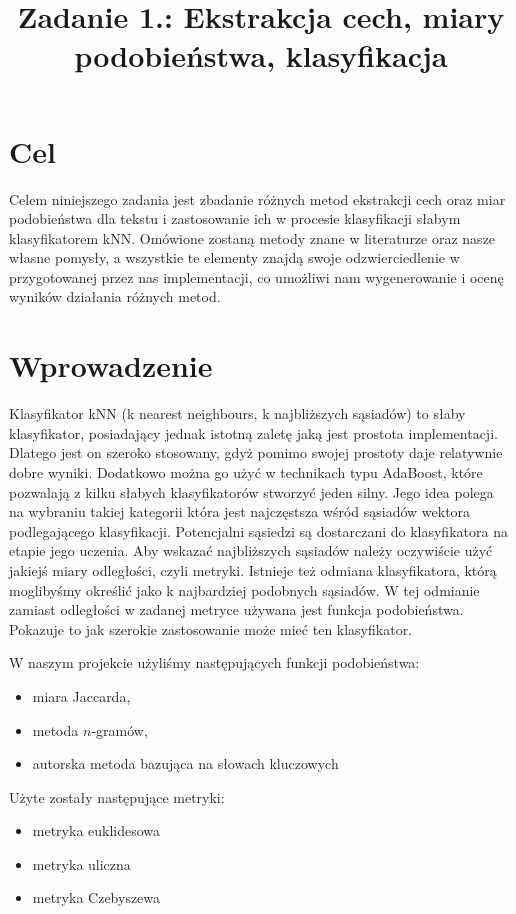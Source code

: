 \documentclass[a4paper]{classrep}
\author{%
  \studentinfo{Mateusz Grotek}{186816} \and
  \studentinfo{Paweł Tarasiuk}{186875}
}
\title{Zadanie 1.: Ekstrakcja cech, miary podobieństwa, klasyfikacja}
\begin{document}
\maketitle
\section{Cel}
Celem niniejszego zadania jest zbadanie różnych metod ekstrakcji cech
oraz miar podobieństwa dla tekstu i zastosowanie ich w procesie klasyfikacji słabym klasyfikatorem kNN.
Omówione zostaną metody znane w literaturze oraz nasze własne pomysły,
a wszystkie te elementy znajdą swoje odzwierciedlenie w przygotowanej
przez nas implementacji, co umożliwi nam wygenerowanie i ocenę wyników
działania różnych metod.
\section{Wprowadzenie}
Klasyfikator kNN (k nearest neighbours, k najbliższych sąsiadów) to słaby klasyfikator, posiadający jednak istotną zaletę jaką jest prostota implementacji.
Dlatego jest on szeroko stosowany, gdyż pomimo swojej prostoty daje relatywnie dobre wyniki. Dodatkowo można go użyć w technikach typu AdaBoost,
które pozwalają z kilku słabych klasyfikatorów stworzyć jeden silny. Jego idea polega na wybraniu takiej kategorii która jest najczęstsza wśród sąsiadów wektora podlegającego klasyfikacji.
Potencjalni sąsiedzi są dostarczani do klasyfikatora na etapie jego uczenia. Aby wskazać najbliższych sąsiadów należy oczywiście użyć jakiejś miary odległości, czyli metryki.
Istnieje też odmiana klasyfikatora, którą moglibyśmy określić jako k najbardziej podobnych sąsiadów. W tej odmianie zamiast odległości w zadanej metryce używana jest funkcja podobieństwa.
Pokazuje to jak szerokie zastosowanie może mieć ten klasyfikator.

W naszym projekcie użyliśmy następujących funkcji podobieństwa:
\begin{itemize}
\item miara Jaccarda,
\item metoda \(n\)-gramów,
\item autorska metoda bazująca na słowach kluczowych
\end{itemize}
Użyte zostały następujące metryki:
\begin{itemize}
\item metryka euklidesowa
\item metryka uliczna
\item metryka Czebyszewa
\end{itemize}
\end{document}
